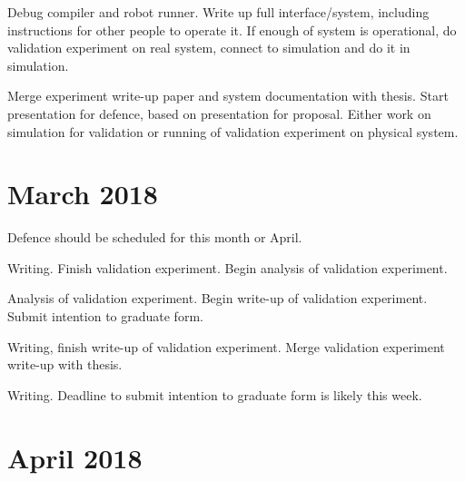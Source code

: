 Debug compiler and robot runner. 
Write up full interface/system, including instructions for other people to operate it. 
If enough of system is operational, do validation experiment on real system, connect to simulation and do it in simulation. 


Merge experiment write-up paper and system documentation with thesis.
Start presentation for defence, based on presentation for proposal. 
Either work on simulation for validation or running of validation experiment on physical system. 

\section{March 2018}

Defence should be scheduled for this month or April. 


Writing.
Finish validation experiment.
Begin analysis of validation experiment. 


Analysis of validation experiment. 
Begin write-up of validation experiment. 
Submit intention to graduate form. 


Writing, finish write-up of validation experiment. Merge validation experiment write-up with thesis. 


Writing. 
Deadline to submit intention to graduate form is likely this week. 

\section{April 2018}


